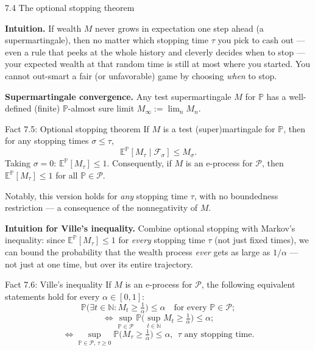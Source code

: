 \documentclass[aspectratio=169,10pt]{beamer}
\newcommand{\Nmb}{\mathbb{N}}
\begin{document}
\begin{frame}[allowframebreaks]{7.4 The optional stopping theorem}

\textbf{Intuition.} If wealth $M$ never grows in expectation one step ahead (a supermartingale), then no matter
which stopping time $\tau$ you pick to cash out --- even a rule that peeks at the whole history and cleverly
decides when to stop --- your expected wealth at that random time is still at most where you started. You cannot
out-smart a fair (or unfavorable) game by choosing \emph{when} to stop.

\textbf{Supermartingale convergence.} Any test supermartingale $M$ for $\mathbb{P}$ has a well-defined
(finite) $\mathbb{P}$-almost sure limit $M_\infty := \lim_n M_n$.

\begin{block}{Fact 7.5: Optional stopping theorem}
If $M$ is a test (super)martingale for $\mathbb P$, then for any stopping times $\sigma \le \tau$,
$$\mathbb{E}^{\mathbb{P}}[M_\tau \mid \mathcal F_\sigma] \le M_\sigma.$$
Taking $\sigma = 0$: $\mathbb{E}^{\mathbb P}[M_\tau] \le 1$. Consequently, if $M$ is an e-process for $\mathcal P$,
then $\mathbb E^{\mathbb P}[M_\tau] \le 1$ for all $\mathbb P \in \mathcal P$.
\end{block}

Notably, this version holds for \emph{any} stopping time $\tau$, with no boundedness restriction --- a consequence
of the nonnegativity of $M$.

\framebreak

\textbf{Intuition for Ville's inequality.} Combine optional stopping with Markov's inequality: since
$\mathbb E^{\mathbb P}[M_\tau] \le 1$ for \emph{every} stopping time $\tau$ (not just fixed times), we can bound the
probability that the wealth process \emph{ever} gets as large as $1/\alpha$ --- not just at one time, but over its
entire trajectory.

\begin{block}{Fact 7.6: Ville's inequality}
If $M$ is an e-process for $\mathcal P$, the following equivalent statements hold for every $\alpha \in [0,1]$:
\begin{equation}
\mathbb{P}\Big(\exists t \in \mathbb N : M_t \ge \tfrac{1}{\alpha}\Big) \le \alpha \quad \text{for every } \mathbb P \in \mathcal P;
\tag{Ville}
\end{equation}
\begin{equation}
\iff \sup_{\mathbb P\in\mathcal P}\mathbb{P}\Big(\sup_{t\in\Nmb} M_t \ge \tfrac1\alpha\Big) \le \alpha;
\tag{7.4a}
\end{equation}
\begin{equation}
\iff \sup_{\mathbb P\in\mathcal P,\,\tau\ge0}\mathbb{P}\Big(M_\tau \ge \tfrac1\alpha\Big)\le\alpha,\ \ \tau \text{ any stopping time}.
\tag{7.4b}
\end{equation}
\end{block}


\end{frame}
\end{document}
